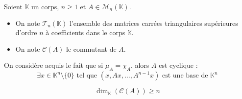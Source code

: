 




	Soient $\mathbb{K}$ un corps, $n \geq 1$ et $A \in \mathcal{M}_n(\mathbb{K})$.

	\begin{notation}
		\begin{itemize}
			\item On note $\mathcal{T}_n(\mathbb{K})$ l'ensemble des matrices carrées triangulaires supérieures d'ordre $n$ à coefficients dans le corps $\mathbb{K}$.
			\item On note $\mathcal{C}(A)$ le commutant de $A$.
		\end{itemize}
	\end{notation}


	\begin{remark}
		\label{dimension-du-commutant-1}
		On considère acquis le fait que si $\mu_A = \chi_A$, alors $A$ est cyclique :
		\[ \exists x \in \mathbb{K}^n \setminus \{ 0 \} \text{ tel que } (x, Ax, \dots, A^{n-1}x) \text{ est une base de } \mathbb{K}^n \]
	\end{remark}


	\begin{lemma}
		\label{dimension-du-commutant-2}
		\[ \dim_{\mathbb{K}}(\mathcal{C}(A)) \geq n \]
	\end{lemma}

